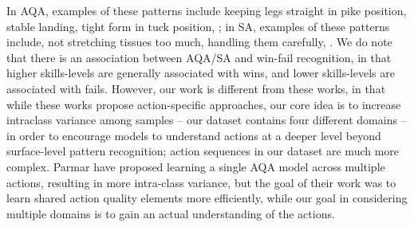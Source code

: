 \documentclass[final]{cvpr}
\begin{document}
In AQA, examples of these patterns include keeping legs straight in pike position, stable landing, tight form in tuck position, \etc; in SA, examples of these patterns include, not stretching tissues too much, handling them carefully, \etc. We do note that there is an association between AQA/SA and win-fail recognition, in that higher skills-levels are generally associated with wins, and lower skills-levels are associated with fails. However, our work is different from these works, in that while these works propose action-specific approaches,  our core idea is to increase intraclass variance among samples -- our dataset contains four different domains -- in order to encourage models to understand actions at a deeper level beyond surface-level pattern recognition; action sequences in our dataset are much more complex. Parmar \etal \cite{maqa} have proposed learning a single AQA model across multiple actions, resulting in more intra-class variance, but the goal of their work was to learn shared action quality elements more efficiently, while our goal in considering multiple domains is to gain an actual understanding of the actions.\\
\end{document}
